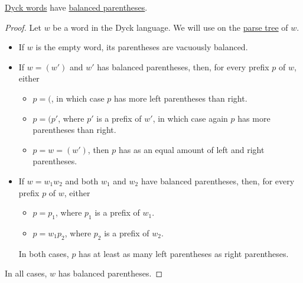 \begin{proposition}\label{thm:dyck_language_balanced}
  \hyperref[def:dyck_language]{Dyck words} have \hyperref[def:paired_delimiters]{balanced parentheses}.
\end{proposition}
\begin{proof}
  Let \( w \) be a word in the Dyck language. We will use  on the \hyperref[def:parse_tree]{parse tree} of \( w \).

  \begin{itemize}
    \item If \( w \) is the empty word, its parentheses are vacuously balanced.
    \item If \( w = (w') \) and \( w' \) has balanced parentheses, then, for every prefix \( p \) of \( w \), either
    \begin{itemize}
      \item \( p = ( \), in which case \( p \) has more left parentheses than right.
      \item \( p = (p' \), where \( p' \) is a prefix of \( w' \), in which case again \( p \) has more parentheses than right.
      \item \( p = w = (w') \), then \( p \) has as an equal amount of left and right parentheses.
    \end{itemize}

    \item If \( w = w_1 w_2 \) and both \( w_1 \) and \( w_2 \) have balanced parentheses, then, for every prefix \( p \) of \( w \), either
    \begin{itemize}
      \item \( p = p_1 \), where \( p_1 \) is a prefix of \( w_1 \).
      \item \( p = w_1 p_2 \), where \( p_2 \) is a prefix of \( w_2 \).
    \end{itemize}

    In both cases, \( p \) has at least as many left parentheses as right parentheses.
  \end{itemize}

  In all cases, \( w \) has balanced parentheses.
\end{proof}

